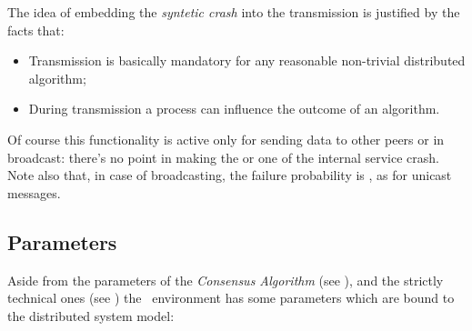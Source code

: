 The idea of embedding the \emph{syntetic crash} into the transmission is
justified by the facts that:
\begin{itemize}

\item   Transmission is basically mandatory for any reasonable non-trivial
        distributed algorithm;

\item   During transmission a process can influence the outcome of an
        algorithm.

\end{itemize}

Of course this functionality is active only for  sending
data to other peers or in broadcast: there's no point in making the
 or one of the internal service crash. Note also that,
in case of broadcasting, the failure probability is \PCrash, as for
unicast messages.


\subsection{Parameters} \label{sub:EnvParams}

Aside from the parameters of the \emph{Consensus Algorithm}
(see ), and the strictly technical ones
(see ) the \YUNA\ environment has some
parameters which are bound to the distributed system model:


